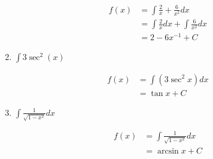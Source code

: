 \documentclass[11pt]{article}
\begin{document}
\begin{enumerate}[{\bf Q1.}]
    \[
        \begin{aligned}
            f(x) &= \int \frac{2}{x} + \frac{6}{x^2} dx\\
            &= \int \frac{2}{x} dx + \int \frac{6}{x^2} dx \\
            &= 2 - 6x^{-1} + C
        \end{aligned}
    \]

    
    \item $\int 3\sec^2(x)$

    \[
        \begin{aligned} 
            f(x) &= \int (3\sec^2 x)dx\\
            &= \tan x + C
        \end{aligned}    
    \]

    \item $\int \frac{1}{\sqrt{1 - x^2}} dx$

    \[
        \begin{aligned}
            f(x) &= \int \frac{1}{\sqrt{1 - x^2}} dx\\
            &= \arcsin x + C
        \end{aligned}
    \]



	
\end{enumerate}
\end{document}
